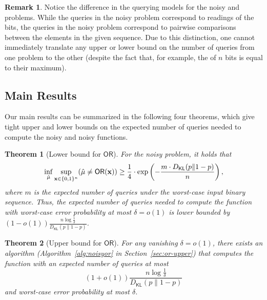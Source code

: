 \documentclass[journal, onecolumn]{IEEEtran}
\theoremstyle{plain}
\newtheorem{theorem}{Theorem}[section]
\theoremstyle{definition}
\newtheorem{remark}{Remark}[section]
\theoremstyle{remark}
\DeclareMathOperator\E{\mathbb{E}}
\let\P\relax
\DeclareMathOperator\P{\mathsf{P}}
\def\DKL{{D_\mathsf{KL}(p\|1-p)}}
\newcommand{\cond}{\mathchoice{\,\vert\,}{\mspace{2mu}\vert\mspace{2mu}}{\vert}{\vert}}
\begin{document}
\begin{remark} \label{remark:or_max_relation}
    Notice the difference in the querying models for the noisy \orn and \maxn problems. While the queries in the noisy \orn problem correspond to readings of the bits, the queries in the noisy \maxn problem correspond to pairwise comparisons between the elements in the given sequence. Due to this distinction, one cannot immediately translate any upper or lower bound on the number of queries from one problem to the other (despite the fact that, for example, the \orn of $n$ bits is equal to their maximum).
\end{remark}


\subsection{Main Results}
\label{sec:main-results}
Our main results can be summarized in the following four theorems, which give tight upper and lower bounds on the expected number of queries needed to compute the noisy \orn and noisy \maxn functions.

\begin{theorem}[Lower bound for $\mathsf{OR}$] \label{thm:or-lower} 
    For the noisy \orn problem, it holds that
    \begin{align*}
        \inf_{\hat\mu} \sup_{{\bf x}\in\{0, 1\}^n} \P(\hat\mu \neq \mathsf{OR}({\bf x}))\geq \frac{1}{4}\cdot \exp\left(-\frac{m\cdot D_{\mathsf{KL}}(p\|1-p)}{n }\right),
    \end{align*}
    where $m$ is the expected number of queries under the worst-case input binary sequence.
    Thus, the expected number of queries needed to compute the \orn function with worst-case error probability at most $\delta = o(1)$ is lower bounded by $(1 - o(1)) \frac{n\log \frac{1}{\delta}}{D_{\mathsf{KL}}(p \| 1-p)}$.
\end{theorem}

\begin{theorem}[Upper bound for $\mathsf{OR}$] \label{thm:or-upper}
    For any vanishing $\delta=o(1)$, there exists an algorithm (Algorithm~\ref{alg:noisyor} in Section~\ref{sec:or-upper}) that computes the \orn function with an expected number of queries at most
    \begin{equation}
        (1+o(1))\frac{n\log \frac{1}{\delta}}{\DKL}
    \end{equation}
    and worst-case error probability at most $\delta$.
\end{theorem}
\end{document}
